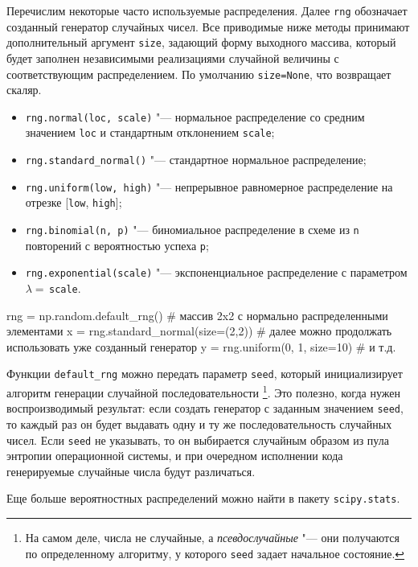 Перечислим некоторые часто используемые распределения.
Далее \verb"rng" обозначает созданный генератор случайных чисел.
Все приводимые ниже методы принимают дополнительный аргумент \verb"size", задающий форму выходного массива, который будет заполнен независимыми реализациями случайной величины с соответствующим распределением.
По умолчанию \verb"size=None", что возвращает скаляр.
\begin{itemize}
\item \verb"rng.normal(loc, scale)" "--- нормальное распределение со средним значением \verb"loc" и стандартным отклонением \verb"scale";
\item \verb"rng.standard_normal()" "--- стандартное нормальное распределение;
\item \verb"rng.uniform(low, high)" "--- непрерывное равномерное распределение на отрезке [\verb"low", \verb"high"];
\item \verb"rng.binomial(n, p)" "--- биномиальное распределение в схеме из \verb"n" повторений с вероятностью успеха \verb"p";
\item \verb"rng.exponential(scale)" "--- экспоненциальное распределение с параметром $\lambda=$\,\verb"scale".
\end{itemize}

\begin{python}
rng = np.random.default_rng()
# массив 2x2 с нормально распределенными элементами
x = rng.standard_normal(size=(2,2))
# далее можно продолжать использовать уже созданный генератор
y = rng.uniform(0, 1, size=10)
# и т.д.
\end{python}

\begin{remark}
\label{np:r:seed}
Функции \verb"default_rng" можно передать параметр \verb"seed", который инициализирует алгоритм генерации  случайной последовательности%
\footnote{На самом деле, числа не случайные, а \emph{псевдослучайные} "--- они получаются по определенному алгоритму, у которого \verb"seed" задает начальное состояние.}.
Это полезно, когда нужен воспроизводимый результат: если создать генератор с заданным значением \verb"seed", то каждый раз он будет выдавать одну и ту же последовательность случайных чисел.
Если \verb"seed" не указывать, то он выбирается случайным образом из пула энтропии операционной системы, и при очередном исполнении кода генерируемые случайные числа будут различаться.
\end{remark}

\begin{remark}
Еще больше вероятностных распределений можно найти в пакету \verb"scipy.stats".
\end{remark}


